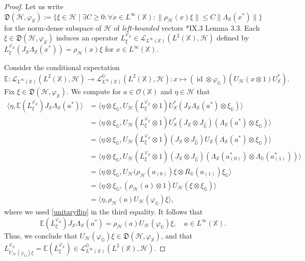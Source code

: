 \documentclass[reqno]{amsart}
\numberwithin{equation}{section}
\DeclareMathOperator{\id}{\mathrm{id}}
\newcommand{\mcH}{\mathcal{H}}
\newcommand{\mcO}{\mathcal{O}}
\newcommand{\G}{\mathbb{G}}
\newcommand{\X}{\mathbb{X}}
\begin{document}
 \begin{proof} Let us write $\mathfrak{D}(\mcH, \varphi_\X):= \{\xi \in \mcH\mid \exists C\ge 0: \forall x\in L^\infty(\X):\|\rho_\mcH(x)\xi\|\le C\|\Lambda_\X(x^*)\|\}$ for the norm-dense subspace of $\mcH$ of \emph{left-bounded} vectors \cite{Tak03}*{IX.3 Lemma 3.3}. Each $\xi \in \mathfrak{D}(\mcH, \varphi_\X)$ induces an operator $L_\xi^{\varphi_\X}\in \mathscr{L}_{L^\infty(\X)}(L^2(\X), \mcH)$ defined by $L_\xi^{\varphi_\X}(J_\X \Lambda_\X(x^*))= \rho_\mcH(x)\xi$ for $x\in L^\infty(\X)$.

Consider the conditional expectation
    $$\mathbb{E}: \mathscr{L}_{L^\infty(\X)}(L^2(\X), \mcH)\to \mathscr{L}_{L^\infty(\X)}^{\G}(L^2(\X), \mcH): x\mapsto (\id \otimes \varphi_\G)(U_\mcH(x\otimes 1)U_\X^*).$$ 
    Fix $\xi \in \mathfrak{D}(\mcH, \varphi_\X)$.
     We compute for $a\in \mcO(\X)$ and $\eta \in \mcH$ that
    \begin{align*}
        \langle \eta, \mathbb{E}(L_\xi^{\varphi_\X})J_\X \Lambda_\X(a^*)\rangle &= \langle \eta \otimes \xi_\G, U_\mcH(L_\xi^{\varphi_\X}\otimes 1)U_\X^*(J_\X\Lambda_\X(a^*)\otimes \xi_\G)\rangle\\
        &= \langle \eta \otimes \xi_\G, U_\mcH(L_\xi^{\varphi_\X}\otimes 1) U_\X^*(J_\X \otimes J_{\hat{\G}})(\Lambda_\X(a^*)\otimes \xi_\G)\rangle\\
        &= \langle \eta \otimes \xi_\G, U_\mcH(L_\xi^{\varphi_\X}\otimes 1)(J_\X\otimes J_{\hat{\G}})U_\X(\Lambda_\X(a^*)\otimes \xi_\G)\rangle\\
        &= \langle \eta \otimes \xi_\G, U_\mcH(L_\xi^{\varphi_\X}\otimes 1)(J_\X\otimes J_{\hat{\G}})(\Lambda_\X(a_{(0)}^*)\otimes \Lambda_\G(a_{(1)}^*))\rangle\\
        &= \langle \eta \otimes \xi_\G, U_\mcH(\rho_\mcH(a_{(0)})\xi \otimes R_\G(a_{(1)})\xi_\G\rangle\\
        &= \langle \eta \otimes \xi_\G, (\rho_\mcH(a)\otimes 1)U_\mcH(\xi \otimes \xi_\G)\rangle \\
        &= \langle \eta, \rho_\mcH(a)U_\mcH(\varphi_\G)\xi\rangle,
    \end{align*}
    where we used \eqref{unitaryflip} in the third equality. It follows that
    $$\mathbb{E}(L_\xi^{\varphi_\X})J_\X\Lambda_\X(a^*)= \rho_\mcH(a)U_\mcH(\varphi_\G)\xi, \quad a \in L^\infty(\X).$$
Thus, we conclude that  $U_\mcH(\varphi_\G)\xi \in \mathfrak{D}(\mcH,\varphi_\X)$, and that $L_{U_\mcH(\varphi_\G)\xi}^{\varphi_\X}= \mathbb{E}(L_\xi^{\varphi_\X})\in \mathscr{L}_{L^\infty(\X)}^\G(L^2(\X), \mcH)$.


\end{proof}
\end{document}
